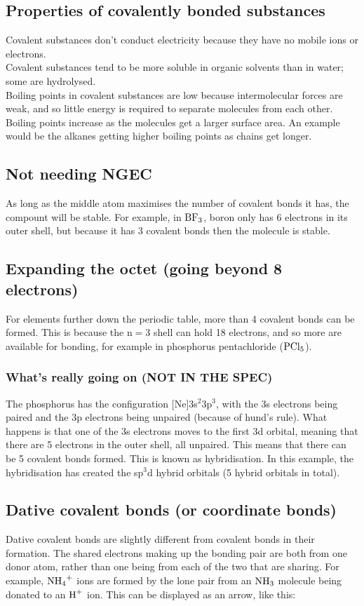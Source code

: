 \subsection{Properties of covalently bonded substances}
Covalent substances don't conduct electricity because they have no mobile ions or electrons.
\\
Covalent substances tend to be more soluble in organic solvents than in water; some are hydrolysed.
\\
Boiling points in covalent substances are low because intermolecular forces are weak, and so little energy is required to separate molecules from each other. Boiling points increase as the molecules get a larger surface area. An example would be the alkanes getting higher boiling points as chains get longer.

\subsection{Not needing NGEC}
As long as the middle atom maximises the number of covalent bonds it has, the compount will be stable. For example, in $\ce{BF3}$, boron only has 6 electrons in its outer shell, but because it has 3 covalent bonds then the molecule is stable.
\subsection{Expanding the octet (going beyond 8 electrons)}
For elements further down the periodic table, more than 4 covalent bonds can be formed. This is because the n$=3$ shell can hold 18 electrons, and so more are available for bonding, for example in phosphorus pentachloride ($\ce{PCl5}$).
\subsubsection{What's really going on (NOT IN THE SPEC)}
The phosphorus has the configuration [Ne]3s$^2$3p$^3$, with the 3s electrons being paired and the 3p electrons being unpaired (because of hund's rule). What happens is that one of the 3s electrons moves to the first 3d orbital, meaning that there are 5 electrons in the outer shell, all unpaired. This means that there can be 5 covalent bonds formed. This is known as hybridisation. In this example, the hybridisation has created the sp$^3$d hybrid orbitals (5 hybrid orbitals in total).


\subsection{Dative covalent bonds (or coordinate bonds)}
Dative covalent bonds are slightly different from covalent bonds in their formation. The shared electrons making up the bonding pair are both from one donor atom, rather than one being from each of the two that are sharing. For example, $\ce{NH4+}$ ions are formed by the lone pair from an $\ce{NH3}$ molecule being donated to an $\ce{H^+}$ ion. This can be displayed as an arrow, like this:\\
\begin{center}
\end{center}

